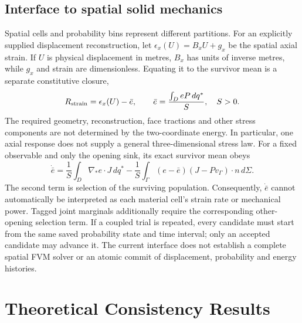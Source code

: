 \documentclass[11pt]{article}
\begin{document}
\subsection{Interface to spatial solid mechanics}
Spatial cells and probability bins represent different partitions.
For an explicitly supplied displacement reconstruction, let
$\epsilon_x(U)=B_xU+g_x$ be the spatial axial strain. If $U$ is physical
displacement in metres, $B_x$ has units of inverse metres, while $g_x$ and
strain are dimensionless.
Equating it to the survivor mean is a separate constitutive closure,
\begin{equation}
 R_{\rm strain}=\epsilon_x(U)-\bar e,\qquad
 \bar e=\frac{\int_D eP\,dq^*}{S},\quad S>0.
\end{equation}
The required geometry, reconstruction, face tractions and other stress components
are not determined by the two-coordinate energy. In particular, one axial
response does not supply a general three-dimensional stress law.
For a fixed observable and only the opening sink, its exact survivor mean obeys
\begin{equation}
 \dot{\bar e}=\frac1S\int_D\nabla_*e\cdot J\,dq^*
 -\frac1S\int_\Gamma(e-\bar e)(J-Pv_\Gamma)\cdot n\,d\Sigma.
\end{equation}
The second term is selection of the surviving population. Consequently,
$\dot{\bar e}$ cannot automatically be interpreted as each material cell's
strain rate or mechanical power. Tagged joint marginals additionally require
the corresponding other-opening selection term.
If a coupled trial is repeated, every candidate must start from the same saved
probability state and time interval; only an accepted candidate may advance it.
The current interface does not establish a complete spatial FVM solver or
an atomic commit of displacement, probability and energy histories.

\section{Theoretical Consistency Results}
\end{document}
